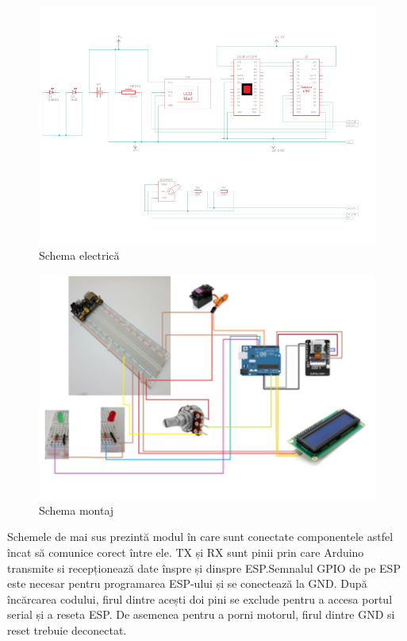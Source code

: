 \documentclass{report}
\begin{document}
\begin{figure}[H]
    \centering
    \includegraphics[width=\textwidth, angle=90]{schema_electricaESP.png}
    \caption{Schema electrică}
    \label{fig:schema_electrica}
\end{figure}

\begin{figure}[H]
    \centering
    \includegraphics[width=1.3\textwidth, angle=90]{schema_montajESP.png}
    \caption{Schema montaj}
    \label{fig:schema_montaj}
\end{figure}

\newpage
\vspace*{1cm}
Schemele de mai sus prezintă modul în care sunt conectate componentele astfel încat să comunice corect între ele. TX și RX sunt pinii prin care Arduino transmite si recepționează date înspre și dinspre ESP.Semnalul GPIO de pe ESP este necesar pentru programarea ESP-ului și se conectează la GND. După încărcarea codului, firul dintre acești doi pini se exclude pentru a accesa portul serial și a reseta ESP. De asemenea pentru a porni motorul, firul dintre GND si reset trebuie deconectat. 
\end{document}
